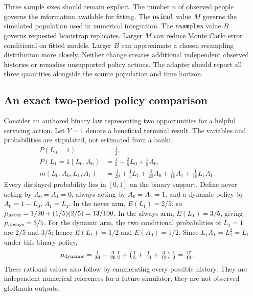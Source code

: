 Three sample sizes should remain explicit. The number $n$ of observed people governs the information available for fitting. The \texttt{nsimul} value $M$ governs the simulated population used in numerical integration. The \texttt{nsamples} value $B$ governs requested bootstrap replicates. Larger $M$ can reduce Monte Carlo error conditional on fitted models. Larger $B$ can approximate a chosen resampling distribution more closely. Neither change creates additional independent observed histories or remedies unsupported policy actions. The adapter should report all three quantities alongside the source population and time horizon.

\subsection{An exact two-period policy comparison}
\label{exec20:gformula-example}
Consider an authored binary law representing two opportunities for a helpful servicing action. Let $Y=1$ denote a beneficial terminal result. The variables and probabilities are stipulated, not estimated from a bank:
\begin{align}
 P(L_0=1)&=\tfrac12, \nonumber\\
 P(L_1=1\mid L_0,A_0)&=\tfrac15+\tfrac25L_0+\tfrac15A_0, \nonumber\\
 m(L_0,A_0,L_1,A_1)&=\tfrac1{20}+\tfrac15L_1
                   +\tfrac3{20}A_0+\tfrac1{10}A_1
                   +\tfrac3{10}L_1A_1.
 \label{exec20:gformula-example-law}
\end{align}
Every displayed probability lies in $[0,1]$ on the binary support. Define never acting by $A_0=A_1=0$, always acting by $A_0=A_1=1$, and a dynamic policy by $A_0=1-L_0$, $A_1=L_1$. In the never arm, $E(L_1)=2/5$, so $\mu_{\rm never}=1/20+(1/5)(2/5)=13/100$. In the always arm, $E(L_1)=3/5$, giving $\mu_{\rm always}=3/5$. For the dynamic arm, the two conditional probabilities of $L_1=1$ are $2/5$ and $3/5$; hence $E(L_1)=1/2$ and $E(A_0)=1/2$. Since $L_1A_1=L_1^2=L_1$ under this binary policy,
\begin{equation}
 \mu_{\rm dynamic}
 =\tfrac1{20}+\tfrac3{20}\tfrac12
    +\left(\tfrac15+\tfrac1{10}+\tfrac3{10}\right)\tfrac12
 =\tfrac{17}{40}.
 \label{exec20:gformula-values}
\end{equation}
These rational values also follow by enumerating every possible history. They are independent numerical references for a future simulator; they are not observed gfoRmula outputs.~\citep{exec20_gformula_reference}

